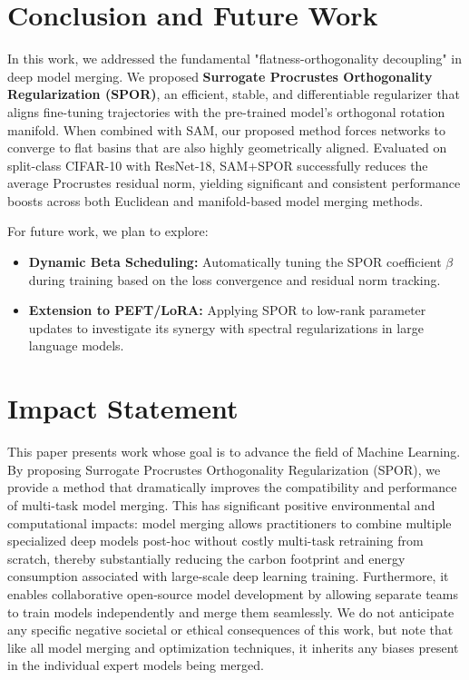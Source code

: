 \documentclass{article}
\theoremstyle{plain}
\theoremstyle{definition}
\theoremstyle{remark}
\begin{document}
\section{Conclusion and Future Work}
\label{sec:conclusion}
In this work, we addressed the fundamental "flatness-orthogonality decoupling" in deep model merging. We proposed \textbf{Surrogate Procrustes Orthogonality Regularization (SPOR)}, an efficient, stable, and differentiable regularizer that aligns fine-tuning trajectories with the pre-trained model's orthogonal rotation manifold. When combined with SAM, our proposed method forces networks to converge to flat basins that are also highly geometrically aligned. Evaluated on split-class CIFAR-10 with ResNet-18, SAM+SPOR successfully reduces the average Procrustes residual norm, yielding significant and consistent performance boosts across both Euclidean and manifold-based model merging methods.

For future work, we plan to explore:
\begin{itemize}
    \item \textbf{Dynamic Beta Scheduling:} Automatically tuning the SPOR coefficient $\beta$ during training based on the loss convergence and residual norm tracking.
    \item \textbf{Extension to PEFT/LoRA:} Applying SPOR to low-rank parameter updates to investigate its synergy with spectral regularizations in large language models.
\end{itemize}

\section*{Impact Statement}
This paper presents work whose goal is to advance the field of Machine Learning. By proposing Surrogate Procrustes Orthogonality Regularization (SPOR), we provide a method that dramatically improves the compatibility and performance of multi-task model merging. This has significant positive environmental and computational impacts: model merging allows practitioners to combine multiple specialized deep models post-hoc without costly multi-task retraining from scratch, thereby substantially reducing the carbon footprint and energy consumption associated with large-scale deep learning training. Furthermore, it enables collaborative open-source model development by allowing separate teams to train models independently and merge them seamlessly. We do not anticipate any specific negative societal or ethical consequences of this work, but note that like all model merging and optimization techniques, it inherits any biases present in the individual expert models being merged.
\end{document}
